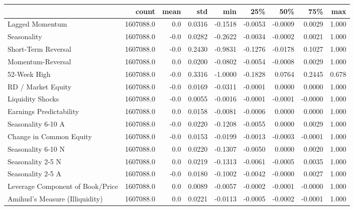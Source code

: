 \begin{tabular}{lrrrrrrrr}
\toprule
{} &      count &  mean &     std &     min &     25\% &     50\% &     75\% &    max \\
\midrule
Lagged Momentum                            &  1607088.0 &   0.0 &  0.0316 & -0.1518 & -0.0053 & -0.0009 &  0.0029 &  1.000 \\
Seasonality                                &  1607088.0 &  -0.0 &  0.0282 & -0.2622 & -0.0034 & -0.0002 &  0.0021 &  1.000 \\
Short-Term Reversal                        &  1607088.0 &  -0.0 &  0.2430 & -0.9831 & -0.1276 & -0.0178 &  0.1027 &  1.000 \\
Momentum-Reversal                          &  1607088.0 &   0.0 &  0.0200 & -0.0802 & -0.0054 & -0.0008 &  0.0029 &  1.000 \\
52-Week High                               &  1607088.0 &  -0.0 &  0.3316 & -1.0000 & -0.1828 &  0.0764 &  0.2445 &  0.678 \\
RD / Market Equity                         &  1607088.0 &  -0.0 &  0.0169 & -0.0311 & -0.0001 &  0.0000 &  0.0000 &  1.000 \\
Liquidity Shocks                           &  1607088.0 &  -0.0 &  0.0055 & -0.0016 & -0.0001 & -0.0001 & -0.0000 &  1.000 \\
Earnings Predictability                    &  1607088.0 &   0.0 &  0.0158 & -0.0081 & -0.0006 &  0.0000 &  0.0000 &  1.000 \\
Seasonality 6-10 A                         &  1607088.0 &  -0.0 &  0.0220 & -0.1208 & -0.0055 &  0.0000 &  0.0029 &  1.000 \\
Change in Common Equity                    &  1607088.0 &  -0.0 &  0.0153 & -0.0199 & -0.0013 & -0.0003 & -0.0001 &  1.000 \\
Seasonality 6-10 N                         &  1607088.0 &   0.0 &  0.0220 & -0.1307 & -0.0050 &  0.0000 &  0.0020 &  1.000 \\
Seasonality 2-5 N                          &  1607088.0 &   0.0 &  0.0219 & -0.1313 & -0.0061 & -0.0005 &  0.0035 &  1.000 \\
Seasonality 2-5 A                          &  1607088.0 &  -0.0 &  0.0180 & -0.1002 & -0.0042 & -0.0000 &  0.0027 &  1.000 \\
Leverage Component of Book/Price           &  1607088.0 &   0.0 &  0.0089 & -0.0057 & -0.0002 & -0.0001 & -0.0000 &  1.000 \\
Amihud's Measure (Illiquidity)             &  1607088.0 &   0.0 &  0.0221 & -0.0113 & -0.0005 & -0.0002 & -0.0001 &  1.000 \\

\end{tabular}
